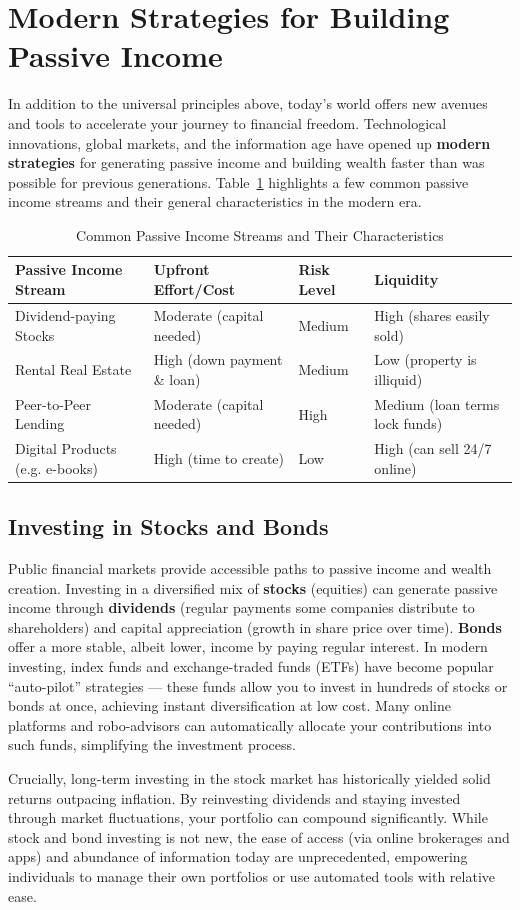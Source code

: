 \documentclass[12pt]{article}
\begin{document}
\section{Modern Strategies for Building Passive Income}
In addition to the universal principles above, today's world offers new avenues and tools to accelerate your journey to financial freedom. Technological innovations, global markets, and the information age have opened up \textbf{modern strategies} for generating passive income and building wealth faster than was possible for previous generations. Table~\ref{tab:streams} highlights a few common passive income streams and their general characteristics in the modern era.
\begin{table}[h]
\centering
\begin{tabular}{llll}
\toprule
\textbf{Passive Income Stream} & \textbf{Upfront Effort/Cost} & \textbf{Risk Level} & \textbf{Liquidity} \\
\midrule
Dividend-paying Stocks        & Moderate (capital needed)    & Medium             & High (shares easily sold) \\
Rental Real Estate            & High (down payment \& loan)   & Medium             & Low (property is illiquid) \\
Peer-to-Peer Lending          & Moderate (capital needed)    & High               & Medium (loan terms lock funds) \\
Digital Products (e.g. e-books) & High (time to create)      & Low                & High (can sell 24/7 online) \\
\bottomrule
\end{tabular}
\caption{Common Passive Income Streams and Their Characteristics}
\label{tab:streams}
\end{table}
\subsection{Investing in Stocks and Bonds}
Public financial markets provide accessible paths to passive income and wealth creation. Investing in a diversified mix of \textbf{stocks} (equities) can generate passive income through \textbf{dividends} (regular payments some companies distribute to shareholders) and capital appreciation (growth in share price over time). \textbf{Bonds} offer a more stable, albeit lower, income by paying regular interest. In modern investing, index funds and exchange-traded funds (ETFs) have become popular ``auto-pilot'' strategies --- these funds allow you to invest in hundreds of stocks or bonds at once, achieving instant diversification at low cost. Many online platforms and robo-advisors can automatically allocate your contributions into such funds, simplifying the investment process.
\par
Crucially, long-term investing in the stock market has historically yielded solid returns outpacing inflation. By reinvesting dividends and staying invested through market fluctuations, your portfolio can compound significantly. While stock and bond investing is not new, the ease of access (via online brokerages and apps) and abundance of information today are unprecedented, empowering individuals to manage their own portfolios or use automated tools with relative ease.
\end{document}
